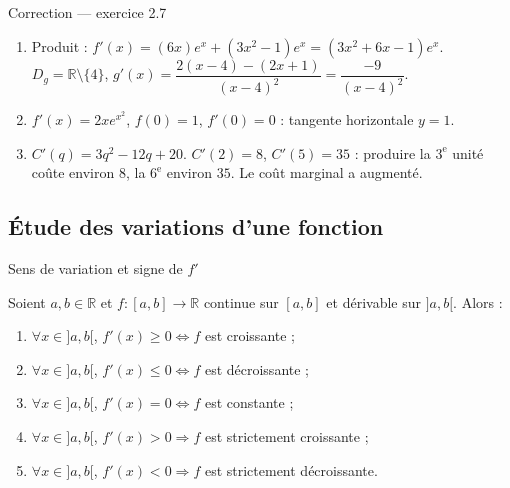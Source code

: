 \documentclass[aspectratio=169,11pt]{beamer}
\newcommand{\R}{\mathbb{R}}
\newcommand{\fonc}[3]{#1\colon #2\to #3}
\begin{document}
\begin{frame}{Correction --- exercice 2.7}
	\begin{definitionbox}[Correction]
		\begin{enumerate}
			\item Produit : $f'(x)=(6x)e^x+(3x^2-1)e^x=(3x^2+6x-1)e^x$.\\
			$D_g=\R\setminus\{4\}$,
			$g'(x)=\dfrac{2(x-4)-(2x+1)}{(x-4)^2}=\dfrac{-9}{(x-4)^2}$.
			\item $f'(x)=2xe^{x^2}$, $f(0)=1$, $f'(0)=0$ : tangente horizontale $y=1$.
			\item $C'(q)=3q^2-12q+20$. $C'(2)=8$, $C'(5)=35$ :
			produire la $3^{\text{e}}$ unité coûte environ $8$, la $6^{\text{e}}$ environ $35$.
			Le coût marginal a augmenté.
		\end{enumerate}
	\end{definitionbox}
\end{frame}

\subsection{Étude des variations d'une fonction}

\begin{frame}{Sens de variation et signe de $f'$}
	\begin{definitionbox}[Proposition]
		Soient $a,b\in\R$ et $\fonc{f}{[a,b]}{\R}$ continue sur $[a,b]$ et dérivable sur $]a,b[$. Alors :
		\begin{enumerate}
			\item $\forall x\in]a,b[$, $f'(x)\ge 0 \iff f$ est croissante ;
			\item $\forall x\in]a,b[$, $f'(x)\le 0 \iff f$ est décroissante ;
			\item $\forall x\in]a,b[$, $f'(x)=0 \iff f$ est constante ;
			\item $\forall x\in]a,b[$, $f'(x)>0 \Rightarrow f$ est strictement croissante ;
			\item $\forall x\in]a,b[$, $f'(x)<0 \Rightarrow f$ est strictement décroissante.
		\end{enumerate}
	\end{definitionbox}
\end{frame}
\end{document}

